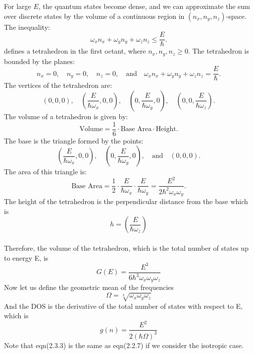 \documentclass{article}
\numberwithin{equation}{section}
\numberwithin{equation}{subsection}
\begin{document}
For large \(E\), the quantum states become dense, and we can approximate the sum over discrete states by the volume of a continuous region in \((\mathit{n}_{\mathit{x}}, \mathit{n}_{\mathit{y}}, \mathit{n}_{\mathit{z}})\)-space. The inequality:
\[
\omega_{\mathit{x}} \mathit{n}_{\mathit{x}} + \omega_{\mathit{y}} \mathit{n}_{\mathit{y}} + \omega_{\mathit{z}} \mathit{n}_{\mathit{z}} \leq \frac{E}{\hbar}.
\]
defines a tetrahedron in the first octant, where \(\mathit{n}_{\mathit{x}}, \mathit{n}_{\mathit{y}}, \mathit{n}_{\mathit{z}} \geq 0\).
The tetrahedron is bounded by the planes:
\[
\mathit{n}_{\mathit{x}} = 0, \quad \mathit{n}_{\mathit{y}} = 0, \quad \mathit{n}_{\mathit{z}} = 0, \quad \text{and} \quad \omega_{\mathit{x}} \mathit{n}_{\mathit{x}} + \omega_{\mathit{y}} \mathit{n}_{\mathit{y}} + \omega_{\mathit{z}} \mathit{n}_{\mathit{z}} = \frac{E}{\hbar}.
\]
The vertices of the tetrahedron are:
\[
(0, 0, 0), \quad \left( \frac{E}{\hbar \omega_{\mathit{x}}}, 0, 0 \right), \quad \left( 0, \frac{E}{\hbar \omega_{\mathit{y}}}, 0 \right), \quad \left( 0, 0, \frac{E }{\hbar \omega_{\mathit{z}}} \right).
\]
The volume of a tetrahedron is given by:
\[
\text{Volume} = \frac{1}{6} \cdot \text{Base Area} \cdot \text{Height}.
\]
The base is the triangle formed by the points:
\[
\left( \frac{E }{\hbar \omega_{\mathit{x}}}, 0, 0 \right), \quad \left( 0, \frac{E }{\hbar \omega_{\mathit{y}}}, 0 \right), \quad \text{and} \quad (0, 0, 0).
\]
The area of this triangle is:
\[
\text{Base Area} = \frac{1}{2} \cdot \frac{E }{\hbar \omega_{\mathit{x}}} \cdot \frac{E}{\hbar \omega_{\mathit{y}}} = \frac{E^2}{2\hbar^2\omega_{\mathit{x}}\omega_{\mathit{y}}}.
\]
The height of the tetrahedron is the perpendicular distance from the base which is \[h = \left(\frac{E}{\hbar\omega_{\mathit{z}}}\right)\]\\
Therefore, the volume of the tetrahedron, which is the total number of states up to energy E, is
\begin{equation}
    G(E) = \frac{E^3}{6\hbar^3\omega_{\mathit{x}}\omega_{\mathit{y}}\omega_{\mathit{z}}}
\end{equation} 
Now let us define the geometric mean of the frequencies 
\begin{equation}
    \Omega = \sqrt[3]{\omega_{\mathit{x}}\omega_{\mathit{y}}\omega_{\mathit{z}}}
\end{equation}
And the DOS is the derivative of the total number of states with respect to E, which is
\begin{equation}
    g(\mathit{n}) = \frac{E^2}{2(\hbar\Omega)^3}
\end{equation} 
Note that eqn(2.3.3) is the same as eqn(2.2.7) if we consider the isotropic case.
\end{document}

